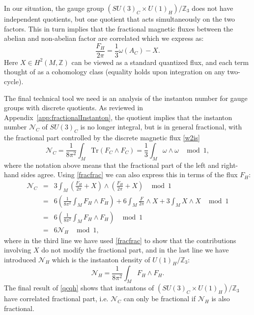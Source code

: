 \documentclass[11pt,a4paper]{article}
\begin{document}
In our situation, the gauge group $(SU(3)_{C}\times U(1)_{H})/\mathbb{Z}_{3}$ does not have independent quotients, but one quotient that acts simultaneously on the two factors.  This in turn implies that the fractional magnetic fluxes between the abelian and non-abelian factor are correlated which we express as:
\begin{equation}\label{fracfrac}
    \frac{F_{H}}{2\pi}=\frac{1}{3}\omega(A_{C})-X.
\end{equation}
Here  $X \in H^{2}(M,\mathbb{Z})$ can be viewed as a standard quantized flux, and each term thought of as a cohomology class (equality holds upon integration on any two-cycle). 

The final technical tool we need is an analysis of the instanton number for gauge groups with discrete quotients. As reviewed in Appendix~\ref{app:fractionalInstanton}, the quotient implies that the instanton number $\mathcal{N}_{C}$ of $SU(3)_{C}$ is no longer integral, but is in general fractional, with the fractional part controlled by the discrete magnetic flux \eqref{w2is}
\begin{equation}\label{infracfirst}
   \mathcal{N}_{C}= \frac{1}{8\pi^{2}}\int_{M}\mathrm{Tr}\left(F_{C}\wedge F_{C}\right)=\frac{1}{3}\int_{M} \omega \wedge \omega ~~\mod 1,
\end{equation}
where the notation above means that the fractional part of the left and right-hand sides agree.  Using \eqref{fracfrac} we can also express this in terms of the flux $F_{H}$: 
\begin{eqnarray}
    \mathcal{N}_{C} & = & 3\int_{M}\left(\frac{F_{H}}{2\pi}+X\right)\wedge\left(\frac{F_{H}}{2\pi}+X\right) ~~\mod 1 \nonumber\\
     & = & 6\left(\frac{1}{8\pi^{2}} \int_{M}F_{H}\wedge F_{H}\right)+6\int_{M}\frac{F}{2\pi}\wedge X+3 \int_{M}X \wedge X ~~\mod 1 \label{qcqh}\\
     & = & 6\left(\frac{1}{8\pi^{2}} \int_{M}F_{H}\wedge F_{H}\right) ~~\mod 1 \nonumber\\
     & = & 6\mathcal{N}_{H}~~ \mod 1,\nonumber
\end{eqnarray}
where in the third line we have used \eqref{fracfrac} to show that the contributions involving $X$ do not modify the fractional part, and in the last line we have introduced $\mathcal{N}_{H}$ which is the instanton density of $U(1)_{H}/\mathbb{Z}_{3}:$
\begin{equation}
    \mathcal{N}_{H}=\frac{1}{8\pi^{2}}\int_{M}F_{H}\wedge F_{H}.
\end{equation}
The final result of \eqref{qcqh} shows that instantons of $(SU(3)_{C}\times U(1)_{H})/\mathbb{Z}_{3}$ have correlated fractional part, i.e. $\mathcal{N}_{C}$ can only be fractional if $\mathcal{N}_{H}$ is also fractional.  
\end{document}
